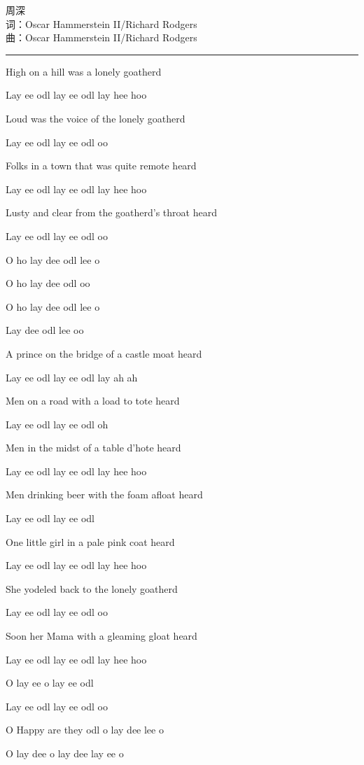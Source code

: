\documentclass[]{ctexbook}
\begin{document}
周深\\
词：Oscar Hammerstein II/Richard Rodgers\\
曲：Oscar Hammerstein II/Richard Rodgers

\begin{center}\rule{0.5\linewidth}{0.5pt}\end{center}

High on a hill was a lonely goatherd

Lay ee odl lay ee odl lay hee hoo

Loud was the voice of the lonely goatherd

Lay ee odl lay ee odl oo

Folks in a town that was quite remote heard

Lay ee odl lay ee odl lay hee hoo

Lusty and clear from the goatherd's throat heard

Lay ee odl lay ee odl oo

O ho lay dee odl lee o

O ho lay dee odl oo

O ho lay dee odl lee o

Lay dee odl lee oo

A prince on the bridge of a castle moat heard

Lay ee odl lay ee odl lay ah ah

Men on a road with a load to tote heard

Lay ee odl lay ee odl oh

Men in the midst of a table d'hote heard

Lay ee odl lay ee odl lay hee hoo

Men drinking beer with the foam afloat heard

Lay ee odl lay ee odl

One little girl in a pale pink coat heard

Lay ee odl lay ee odl lay hee hoo

She yodeled back to the lonely goatherd

Lay ee odl lay ee odl oo

Soon her Mama with a gleaming gloat heard

Lay ee odl lay ee odl lay hee hoo

O lay ee o lay ee odl

Lay ee odl lay ee odl oo

O Happy are they odl o lay dee lee o

O lay dee o lay dee lay ee o
\end{document}
